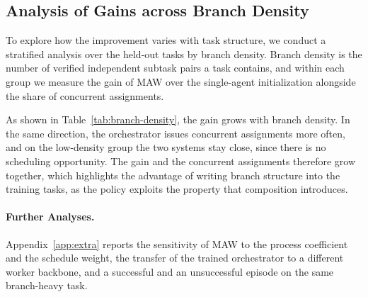 \subsection{Analysis of Gains across Branch Density}
\label{sec:density}

To explore how the improvement varies with task structure, we conduct a stratified analysis over the held-out tasks by branch density.
Branch density is the number of verified independent subtask pairs a task contains, and within each group we measure the gain of MAW over the single-agent initialization alongside the share of concurrent assignments.



As shown in Table~\ref{tab:branch-density}, the gain grows with branch density.
In the same direction, the orchestrator issues concurrent assignments more often, and on the low-density group the two systems stay close, since there is no scheduling opportunity.
The gain and the concurrent assignments therefore grow together, which highlights the advantage of writing branch structure into the training tasks, as the policy exploits the property that composition introduces.

\paragraph{Further Analyses.}
Appendix~\ref{app:extra} reports the sensitivity of MAW to the process coefficient and the schedule weight, the transfer of the trained orchestrator to a different worker backbone, and a successful and an unsuccessful episode on the same branch-heavy task.
